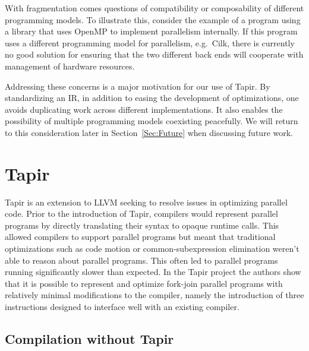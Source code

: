 \documentclass[sigconf]{acmart}
\begin{document}
With fragmentation comes questions of compatibility or composability of
different programming models. To illustrate this, consider the example of
a program using a library that uses OpenMP to implement parallelism internally.
If this program uses a different programming model for parallelism, e.g.\ Cilk,
there is currently no good solution for ensuring that the two different back ends
will cooperate with management of hardware resources.

Addressing these concerns is a major motivation for our use of Tapir.  By
standardizing an IR, in addition to easing the development of optimizations,
one avoids duplicating work across different implementations. It also enables
the possibility of multiple programming models coexisting peacefully. We will
return to this consideration later in Section~\ref{Sec:Future} when
discussing future work.

\section{Tapir} \label{Sec:Tapir}
Tapir is an extension to LLVM
seeking to resolve issues in optimizing parallel code. Prior to
the introduction of Tapir, compilers would represent parallel programs
by directly translating their syntax to opaque runtime calls. This allowed
compilers to support parallel programs but meant that traditional
optimizations such as code motion or common-subexpression elimination weren't
able to reason about parallel programs. This often led to parallel programs
running significantly slower than expected. In the Tapir project the authors
show that it is possible to represent and optimize fork-join parallel programs
with relatively minimal modifications to the compiler, namely the introduction
of three instructions designed to interface well with an existing compiler.

\subsection{Compilation without Tapir}
\end{document}
